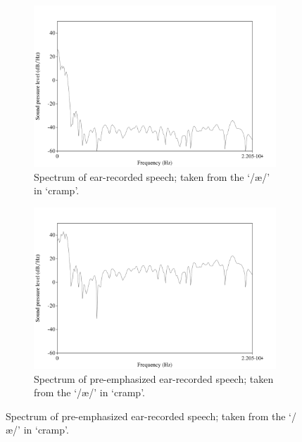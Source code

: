 \begin{figure}[h!]
\begin{subfigure}{0.475\textwidth}
  \centering
  \includegraphics[width=1\linewidth]{figure/spctrmEar20k.png}
  \caption{Spectrum of ear-recorded speech; taken from the `/\ae/' in `cramp'.}
  \label{spctrmEar20kHz}
\end{subfigure}%
\hfill
\begin{subfigure}{0.475\textwidth}
  \centering
  \includegraphics[width=1\linewidth]{figure/spctrmEar20k_preemp.png}
  \caption{Spectrum of pre-emphasized ear-recorded speech; taken from the `/\ae/' in `cramp'.}

\end{subfigure}
\end{figure}
